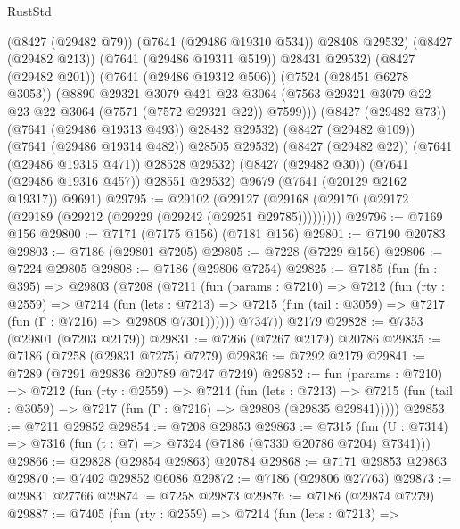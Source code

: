 \begin{lexlean}{RustStd}
\begin{coremodule}
{\begin{coremodule}
{{{{{{{{{{{{{{{{{{{{{{{{{{{{{{{{                    (@8427 (@29482 @79))
                    (@7641 (@29486 @19310 @534))
                    @28408
                    @29532)
                  (@8427 (@29482 @213))
                  (@7641 (@29486 @19311 @519))
                  @28431
                  @29532)
                (@8427 (@29482 @201))
                (@7641 (@29486 @19312 @506))
                (@7524 (@28451 @6278 @3053))
                (@8890
                  @29321
                  @3079
                  @421
                  @23
                  @3064
                  (@7563 @29321 @3079 @22 @23 @22 @3064 (@7571 (@7572 @29321 @22)) @7599)))
              (@8427 (@29482 @73))
              (@7641 (@29486 @19313 @493))
              @28482
              @29532)
            (@8427 (@29482 @109))
            (@7641 (@29486 @19314 @482))
            @28505
            @29532)
          (@8427 (@29482 @22))
          (@7641 (@29486 @19315 @471))
          @28528
          @29532)
        (@8427 (@29482 @30))
        (@7641 (@29486 @19316 @457))
        @28551
        @29532)
      @9679
      (@7641 (@20129 @2162 @19317))
      @9691)
@29795 := @29102
    (@29127 (@29168 (@29170 (@29172 (@29189 (@29212 (@29229 (@29242 (@29251 @29785)))))))))
@29796 := @7169 @156
@29800 := @7171 (@7175 @156) (@7181 @156)
@29801 := @7190 @20783
@29803 := @7186 (@29801 @7205)
@29805 := @7228 (@7229 @156)
@29806 := @7224 @29805
@29808 := @7186 (@29806 @7254)
@29825 := @7185
    (fun (fn : @395) =>
    @29803
      (@7208
        (@7211
          (fun (params : @7210) =>
          @7212
            (fun (rty : @2559) =>
            @7214
              (fun (lets : @7213) =>
              @7215 (fun (tail : @3059) => @7217 (fun (Γ : @7216) => @29808 @7301))))))
        @7347))
    @2179
@29828 := @7353 (@29801 (@7203 @2179))
@29831 := @7266 (@7267 @2179) @20786
@29835 := @7186 (@7258 (@29831 @7275) @7279)
@29836 := @7292 @2179
@29841 := @7289 (@7291 @29836 @20789 @7247 @7249)
@29852 := fun (params : @7210) =>
  @7212
    (fun (rty : @2559) =>
    @7214
      (fun (lets : @7213) =>
      @7215 (fun (tail : @3059) => @7217 (fun (Γ : @7216) => @29808 (@29835 @29841)))))
@29853 := @7211 @29852
@29854 := @7208 @29853
@29863 := @7315
    (fun (U : @7314) => @7316 (fun (t : @7) => @7324 (@7186 (@7330 @20786 @7204) @7341)))
@29866 := @29828 (@29854 @29863) @20784
@29868 := @7171 @29853 @29863
@29870 := @7402 @29852 @6086
@29872 := @7186 (@29806 @27763)
@29873 := @29831 @27766
@29874 := @7258 @29873
@29876 := @7186 (@29874 @7279)
@29887 := @7405
    (fun (rty : @2559) =>
    @7214
      (fun (lets : @7213) =>
}}}}}}}}}}}}}}}}}}}}}}}}}}}}}}}}
\end{coremodule}}
\end{coremodule}
\end{lexlean}
